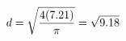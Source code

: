 \documentclass[preview]{standalone}
\begin{document}
\begin{align*}
\special{dvisvgm:raw <g id='unique000'>}d = \sqrt{\frac{4(7.21)}{\pi}} = \sqrt{9.18}\special{dvisvgm:raw </g>}
\end{align*}
\end{document}

